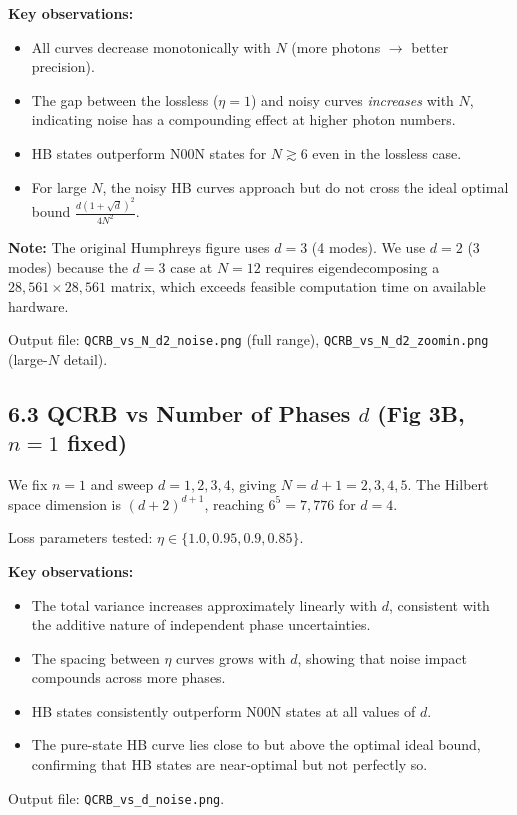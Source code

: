\documentclass[12pt]{article}
\begin{document}
\textbf{Key observations:}
\begin{itemize}
    \item All curves decrease monotonically with $N$ (more photons $\rightarrow$ better precision).
    \item The gap between the lossless ($\eta = 1$) and noisy curves \emph{increases} with $N$, indicating noise has a compounding effect at higher photon numbers.
    \item HB states outperform N00N states for $N \gtrsim 6$ even in the lossless case.
    \item For large $N$, the noisy HB curves approach but do not cross the ideal optimal bound $\frac{d(1+\sqrt{d})^2}{4N^2}$.
\end{itemize}

\textbf{Note:} The original Humphreys figure uses $d=3$ (4 modes). We use $d=2$ (3 modes) because the $d=3$ case at $N=12$ requires eigendecomposing a $28{,}561 \times 28{,}561$ matrix, which exceeds feasible computation time on available hardware.

Output file: \texttt{QCRB\_vs\_N\_d2\_noise.png} (full range), \texttt{QCRB\_vs\_N\_d2\_zoomin.png} (large-$N$ detail).

\subsection*{6.3 QCRB vs Number of Phases $d$ (Fig 3B, $n=1$ fixed)}
We fix $n=1$ and sweep $d = 1, 2, 3, 4$, giving $N = d+1 = 2, 3, 4, 5$. The Hilbert space dimension is $(d+2)^{d+1}$, reaching $6^5 = 7{,}776$ for $d=4$.

Loss parameters tested: $\eta \in \{1.0, 0.95, 0.9, 0.85\}$.

\textbf{Key observations:}
\begin{itemize}
    \item The total variance increases approximately linearly with $d$, consistent with the additive nature of independent phase uncertainties.
    \item The spacing between $\eta$ curves grows with $d$, showing that noise impact compounds across more phases.
    \item HB states consistently outperform N00N states at all values of $d$.
    \item The pure-state HB curve lies close to but above the optimal ideal bound, confirming that HB states are near-optimal but not perfectly so.
\end{itemize}

Output file: \texttt{QCRB\_vs\_d\_noise.png}.
\end{document}
